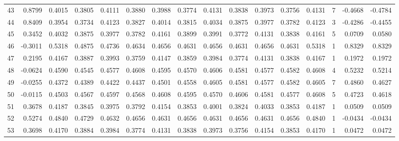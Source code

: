 \begin{tabular}{lrrrrrrrrrrrrrrr}
43  &      0.8799 &  0.4015 &  0.3805 &  0.4111 &  0.3880 &  0.3988 &  0.3774 &  0.4131 &  0.3838 &  0.3973 &   0.3756 &     0.4131 &      7 &                   -0.4668 &                    -0.4784 \\
44  &      0.8409 &  0.3954 &  0.3734 &  0.4123 &  0.3827 &  0.4014 &  0.3815 &  0.4034 &  0.3875 &  0.3977 &   0.3782 &     0.4123 &      3 &                   -0.4286 &                    -0.4455 \\
45  &      0.3452 &  0.4032 &  0.3875 &  0.3977 &  0.3782 &  0.4161 &  0.3899 &  0.3991 &  0.3772 &  0.4131 &   0.3838 &     0.4161 &      5 &                    0.0709 &                     0.0580 \\
46  &     -0.3011 &  0.5318 &  0.4875 &  0.4736 &  0.4634 &  0.4656 &  0.4631 &  0.4656 &  0.4631 &  0.4656 &   0.4631 &     0.5318 &      1 &                    0.8329 &                     0.8329 \\
47  &      0.2195 &  0.4167 &  0.3887 &  0.3993 &  0.3759 &  0.4147 &  0.3859 &  0.3984 &  0.3774 &  0.4131 &   0.3838 &     0.4167 &      1 &                    0.1972 &                     0.1972 \\
48  &     -0.0624 &  0.4590 &  0.4545 &  0.4577 &  0.4608 &  0.4595 &  0.4570 &  0.4606 &  0.4581 &  0.4577 &   0.4582 &     0.4608 &      4 &                    0.5232 &                     0.5214 \\
49  &     -0.0255 &  0.4372 &  0.4389 &  0.4422 &  0.4437 &  0.4501 &  0.4558 &  0.4605 &  0.4581 &  0.4577 &   0.4582 &     0.4605 &      7 &                    0.4860 &                     0.4627 \\
50  &     -0.0115 &  0.4503 &  0.4567 &  0.4597 &  0.4568 &  0.4608 &  0.4595 &  0.4570 &  0.4606 &  0.4581 &   0.4577 &     0.4608 &      5 &                    0.4723 &                     0.4618 \\
51  &      0.3678 &  0.4187 &  0.3845 &  0.3975 &  0.3792 &  0.4154 &  0.3853 &  0.4001 &  0.3824 &  0.4033 &   0.3853 &     0.4187 &      1 &                    0.0509 &                     0.0509 \\
52  &      0.5274 &  0.4840 &  0.4729 &  0.4632 &  0.4656 &  0.4631 &  0.4656 &  0.4631 &  0.4656 &  0.4631 &   0.4656 &     0.4840 &      1 &                   -0.0434 &                    -0.0434 \\
53  &      0.3698 &  0.4170 &  0.3884 &  0.3984 &  0.3774 &  0.4131 &  0.3838 &  0.3973 &  0.3756 &  0.4154 &   0.3853 &     0.4170 &      1 &                    0.0472 &                     0.0472 \\

\end{tabular}
